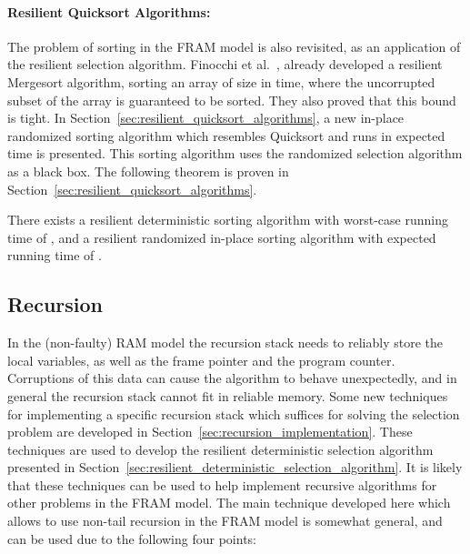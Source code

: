 \documentclass{llncs}
\begin{document}
\paragraph{Resilient Quicksort Algorithms:}

The problem of sorting in the FRAM model is also revisited, as an application of the resilient selection algorithm. Finocchi et al.~\cite{resilient_sorting}, already developed a resilient Mergesort algorithm, sorting an array of size  in  time, where the uncorrupted subset of the array is guaranteed to be sorted. They also proved that this bound is tight. In Section~\ref{sec:resilient_quicksort_algorithms}, a new in-place randomized sorting algorithm which resembles Quicksort and runs in  expected time is presented. This sorting algorithm uses the randomized selection algorithm as a black box.
The following theorem is proven in Section~\ref{sec:resilient_quicksort_algorithms}.

\begin{theorem}
There exists a resilient deterministic sorting algorithm with worst-case running time of , and a resilient randomized in-place sorting algorithm with expected running time of .
\end{theorem}








\subsection{Recursion}

In the (non-faulty) RAM model the recursion stack needs to reliably store the local variables, as well as the frame pointer and the program counter. Corruptions of this data can cause the algorithm to behave unexpectedly, and in general the recursion stack cannot fit in reliable memory. Some new techniques for implementing a specific recursion stack which suffices for solving the selection problem are developed in Section~\ref{sec:recursion_implementation}. These techniques are used to develop the resilient deterministic selection algorithm presented in Section~\ref{sec:resilient_deterministic_selection_algorithm}. It is likely that these techniques can be used to help implement recursive algorithms for other problems in the FRAM model. The main technique developed here which allows to use non-tail recursion in the FRAM model is somewhat general, and can be used due to the following four points:
\end{document}
